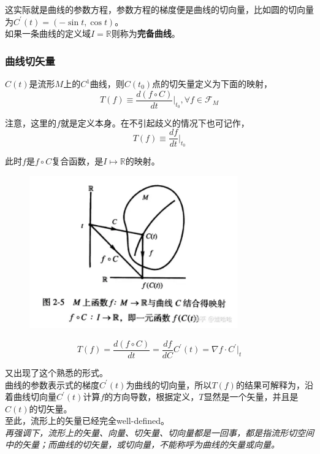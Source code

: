 \documentclass[hpyerref,UTF8,a4paper,titlepage,12pt,oneside]{ctexbook}
\theoremstyle{definition}
\begin{document}
	这实际就是曲线的参数方程，参数方程的梯度便是曲线的切向量，比如圆的切向量为$C^\prime(t) = (-\sin t,\cos t)$。\\

	如果一条曲线的定义域$I = \mathbb{R}$则称为\textbf{完备曲线}。

\subsubsection*{曲线切矢量}
	$C(t)$是流形$M$上的$C^1$曲线，则$C(t_0)$点的切矢量定义为下面的映射，
	$$
		T(f) \equiv \frac{d(f\circ C)}{dt}\Big|_{t_0},\forall f \in \mathscr{F}_{M}
	$$

	注意，这里的$f$就是定义本身。在不引起歧义的情况下也可记作，
	$$
		T(f) \equiv \frac{df}{dt}\Big|_{t_0}
	$$

	此时$f$是$f\circ C$复合函数，是$I\mapsto \mathbb{R}$的映射。

	\begin{figure}[H]
		\begin{center}
			\includegraphics[width=0.8\textwidth]{images/curve.png}
		\end{center}
	\end{figure}

	$$
		T(f) = \frac{d(f\circ C)}{dt} = \frac{df}{dC}C^\prime(t) = \nabla f\cdot C^\prime\Big |_t
	$$

	又出现了这个熟悉的形式。\\

	曲线的参数表示式的梯度$C^\prime(t)$为曲线的切向量，所以$T(f)$的结果可解释为，沿着曲线切向量$C^\prime(t)$计算$f$的方向导数，根据定义，$T$显然是一个矢量，并且是$C(t)$的切矢量。\\


	至此，流形上的矢量已经完全well-defined。\\

	\textit{再强调下，流形上的矢量、向量、切矢量、切向量都是一回事，都是指流形切空间中的矢量；而曲线的切矢量，或切向量，不能称呼为曲线的矢量或向量。}

\end{document}
